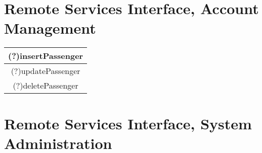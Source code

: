 \documentclass[11pt,oneside,a4paper]{report}
\begin{document}
\section{Remote Services Interface, Account Management}
\begin{tabular}{p{5cm}|p{6cm}}
	\hline
	
	\multicolumn{2}{c}{(?)insertPassenger}\\\hline

	\multicolumn{2}{c}{(?)updatePassenger}\\\hline

	\multicolumn{2}{c}{(?)deletePassenger}\\\hline
	
\end{tabular}


\section{Remote Services Interface, System Administration}
\end{document}
